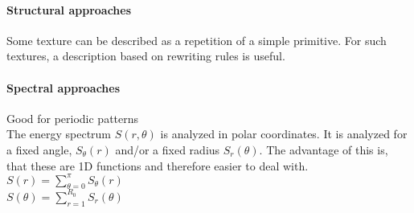 \paragraph{Structural approaches}
Some texture can be described as a repetition of a simple primitive. For such textures, a description based on rewriting rules is useful.
\paragraph{Spectral approaches}
Good for periodic patterns\\
The energy spectrum $S(r,\theta)$ is analyzed in polar coordinates. It is analyzed for a fixed angle, $S_\theta(r)$ and/or a fixed radius $S_r(\theta)$. The advantage of this is, that these are 1D functions and therefore easier to deal with.\\
$S(r)=\sum\limits_{\theta = 0}^{\pi}S_\theta(r)$\\
$S(\theta)=\sum\limits_{r=1}^{R_0}S_r(\theta)$\\
